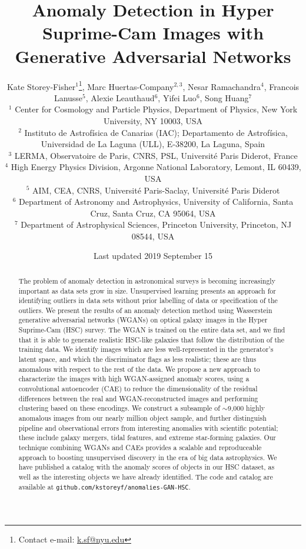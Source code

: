 \documentclass[fleqn,usenatbib,useAMS]{mnras}
\title[Anomalies in Hyper Suprime-Cam Images]{Anomaly Detection in Hyper Suprime-Cam Images with Generative Adversarial Networks}
\author[Storey-Fisher et al]{Kate Storey-Fisher$^{1}$\thanks{Contact e-mail: \href{mailto:k.sf@nyu.edu}{k.sf@nyu.edu}},
Marc Huertas-Company$^{2,3}$,
Nesar Ramachandra$^{4}$,
\newauthor
Francois Lanusse$^{5}$,
Alexie Leauthaud$^{6}$, 
Yifei Luo$^{6}$,
Song Huang$^{7}$
\\
$^{1}$ Center for Cosmology and Particle Physics, Department of Physics, New York University, NY 10003, USA\\
$^{2}$ Instituto de Astrof\'isica de Canarias (IAC); Departamento de Astrof\'isica, Universidad de La Laguna (ULL), E-38200, La Laguna, Spain\\
$^{3}$ LERMA, Observatoire de Paris, CNRS, PSL, Universit\'e Paris Diderot, France\\
$^{4}$ High Energy Physics Division, Argonne National Laboratory, Lemont, IL 60439, USA\\
$^{5}$ AIM, CEA, CNRS, Universit\'e Paris-Saclay, Universit\'e Paris Diderot\\
$^{6}$ Department of Astronomy and Astrophysics, University of California, Santa Cruz, Santa Cruz, CA 95064, USA \\
$^{7}$ Department of Astrophysical Sciences, Princeton University, Princeton, NJ 08544, USA\\
}
\date{Last updated 2019 September 15}
\begin{document}
\label{firstpage}
\pagerange{\pageref{firstpage}--\pageref{lastpage}}
\maketitle

\begin{abstract}
The problem of anomaly detection in astronomical surveys is becoming increasingly important as data sets grow in size.
Unsupervised learning presents an approach for identifying outliers in data sets without prior labelling of data or specification of the outliers. 
We present the results of an anomaly detection method using Wasserstein generative adversarial networks (WGANs) on optical galaxy images in the Hyper Suprime-Cam (HSC) survey.
The WGAN is trained on the entire data set, and we find that it is able to generate realistic HSC-like galaxies that follow the distribution of the training data. 
We identify images which are less well-represented in the generator's latent space, and which the discriminator flags as less realistic; these are thus anomalous with respect to the rest of the data.
We propose a new approach to characterize the images with high WGAN-assigned anomaly scores, using a convolutional autoencoder (CAE) to reduce the dimensionality of the residual differences between the real and WGAN-reconstructed images and performing clustering based on these encodings.
We construct a subsample of $\sim$9,000 highly anomalous images from our nearly million object sample, and further distinguish pipeline and observational errors from interesting anomalies with scientific potential; these include galaxy mergers, tidal features, and extreme star-forming galaxies.
Our technique combining WGANs and CAEs provides a scalable and reproduceable approach to boosting unsupervised discovery in the era of big data astrophysics.
We have published a catalog with the anomaly scores of objects in our HSC dataset, as well as the interesting objects we have already identified.
The code and catalog are available at \texttt{github.com/kstoreyf/anomalies-GAN-HSC}.

\end{abstract}


\end{document}
